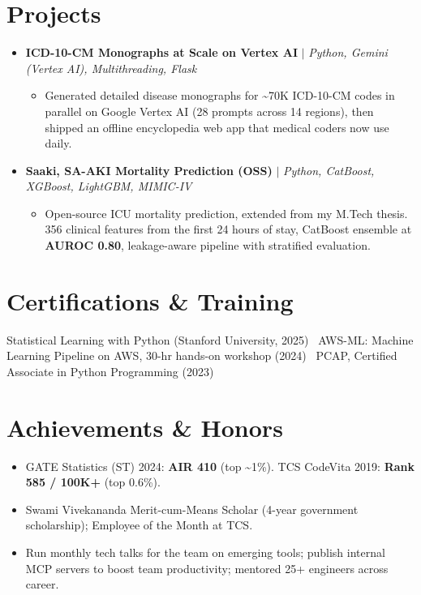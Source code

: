 \documentclass[letterpaper,11pt]{article}
\newcommand{\resumeItem}[1]{\item\small{{#1 \vspace{-2pt}}}}
\newcommand{\resumeProjectHeading}[2]{\item\small #1 #2\vspace{-7pt}}
\newcommand{\resumeSubHeadingListStart}{\begin{itemize}[leftmargin=0.15in, label={}]}
\newcommand{\resumeSubHeadingListEnd}{\end{itemize}}
\newcommand{\resumeItemListStart}{\begin{itemize}}
\newcommand{\resumeItemListEnd}{\end{itemize}\vspace{-5pt}}
\begin{document}
\section{Projects}
\resumeSubHeadingListStart

  \resumeProjectHeading
    {\textbf{ICD-10-CM Monographs at Scale on Vertex AI} $|$ \emph{Python, Gemini (Vertex AI), Multithreading, Flask}}{}
    \resumeItemListStart
      \resumeItem{Generated detailed disease monographs for \textasciitilde 70K ICD-10-CM codes in parallel on Google Vertex AI (28 prompts across 14 regions), then shipped an offline encyclopedia web app that medical coders now use daily.}
    \resumeItemListEnd

  \resumeProjectHeading
    {\textbf{Saaki, SA-AKI Mortality Prediction (OSS)} $|$ \emph{Python, CatBoost, XGBoost, LightGBM, MIMIC-IV}}{}
    \resumeItemListStart
      \resumeItem{Open-source ICU mortality prediction, extended from my M.Tech thesis. 356 clinical features from the first 24 hours of stay, CatBoost ensemble at \textbf{AUROC 0.80}, leakage-aware pipeline with stratified evaluation.}
    \resumeItemListEnd

\resumeSubHeadingListEnd

\section{Certifications \& Training}
\begin{itemize}[leftmargin=0.15in, label={}]
\small{\item{
Statistical Learning with Python (Stanford University, 2025) \textbar\ AWS-ML: Machine Learning Pipeline on AWS, 30-hr hands-on workshop (2024) \textbar\ PCAP, Certified Associate in Python Programming (2023)
}}
\end{itemize}

\section{Achievements \& Honors}
\begin{itemize}[leftmargin=0.15in]
  \item \small GATE Statistics (ST) 2024: \textbf{AIR 410} (top \textasciitilde 1\%). TCS CodeVita 2019: \textbf{Rank 585 / 100K+} (top 0.6\%).
  \item \small Swami Vivekananda Merit-cum-Means Scholar (4-year government scholarship); Employee of the Month at TCS.
  \item \small Run monthly tech talks for the team on emerging tools; publish internal MCP servers to boost team productivity; mentored 25+ engineers across career.
\end{itemize}
\end{document}
